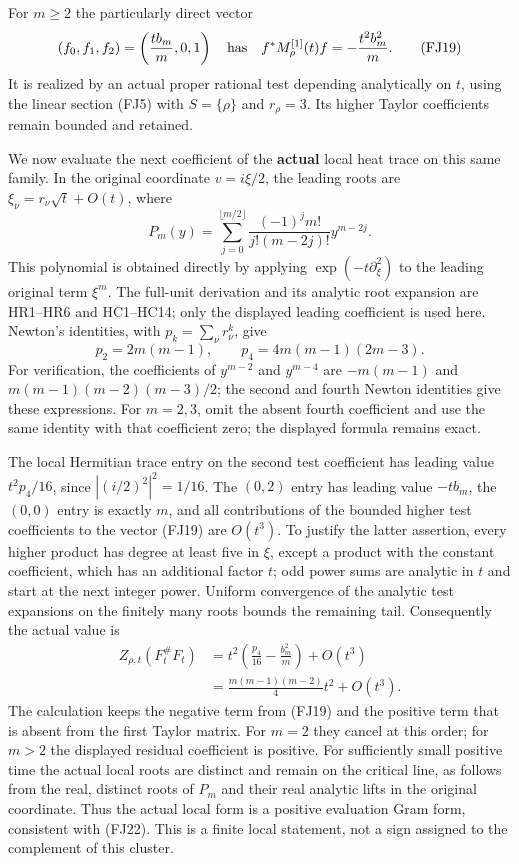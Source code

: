 \documentclass[
  10pt,
  a4paper,
]{article}
\begin{document}
For \(m\ge2\) the particularly direct vector \[
(f_0,f_1,f_2)=\left(\frac{tb_m}{m},0,1\right)
\quad\hbox{has}\quad
f^*M^{[1]}_\rho(t)f=-\frac{t^2b_m^2}{m}.
\tag{FJ19}
\] It is realized by an actual proper rational test depending
analytically on \(t\), using the linear section (FJ5) with
\(S=\{\rho\}\) and \(r_\rho=3\). Its higher Taylor coefficients remain
bounded and retained.

We now evaluate the next coefficient of the \textbf{actual} local heat
trace on this same family. In the original coordinate \(v=i\xi/2\), the
leading roots are \(\xi_\nu=r_\nu\sqrt t+O(t)\), where \[
P_m(y)=\sum_{j=0}^{\lfloor m/2\rfloor}
 \frac{(-1)^j m!}{j!(m-2j)!}y^{m-2j}.
\tag{FJ20}
\] This polynomial is obtained directly by applying
\(\exp(-t\partial_\xi^2)\) to the leading original term \(\xi^m\). The
full-unit derivation and its analytic root expansion are HR1--HR6 and
HC1--HC14; only the displayed leading coefficient is used here. Newton's
identities, with \(p_k=\sum_\nu r_\nu^k\), give \[
p_2=2m(m-1),\qquad p_4=4m(m-1)(2m-3).
\tag{FJ21}
\] For verification, the coefficients of \(y^{m-2}\) and \(y^{m-4}\) are
\(-m(m-1)\) and \(m(m-1)(m-2)(m-3)/2\); the second and fourth Newton
identities give these expressions. For \(m=2,3\), omit the absent fourth
coefficient and use the same identity with that coefficient zero; the
displayed formula remains exact.

The local Hermitian trace entry on the second test coefficient has
leading value \(t^2p_4/16\), since \(|(i/2)^2|^2=1/16\). The \((0,2)\)
entry has leading value \(-tb_m\), the \((0,0)\) entry is exactly \(m\),
and all contributions of the bounded higher test coefficients to the
vector (FJ19) are \(O(t^3)\). To justify the latter assertion, every
higher product has degree at least five in \(\xi\), except a product
with the constant coefficient, which has an additional factor \(t\); odd
power sums are analytic in \(t\) and start at the next integer power.
Uniform convergence of the analytic test expansions on the finitely many
roots bounds the remaining tail. Consequently the actual value is \[
\begin{aligned}
Z_{\rho,t}(F_t^\#F_t)
&=t^2\left(\frac{p_4}{16}-\frac{b_m^2}{m}\right)+O(t^3)\\
&=\frac{m(m-1)(m-2)}4t^2+O(t^3).
\end{aligned}
\tag{FJ22}
\] The calculation keeps the negative term from (FJ19) and the positive
term that is absent from the first Taylor matrix. For \(m=2\) they
cancel at this order; for \(m>2\) the displayed residual coefficient is
positive. For sufficiently small positive time the actual local roots
are distinct and remain on the critical line, as follows from the real,
distinct roots of \(P_m\) and their real analytic lifts in the original
coordinate. Thus the actual local form is a positive evaluation Gram
form, consistent with (FJ22). This is a finite local statement, not a
sign assigned to the complement of this cluster.
\end{document}
